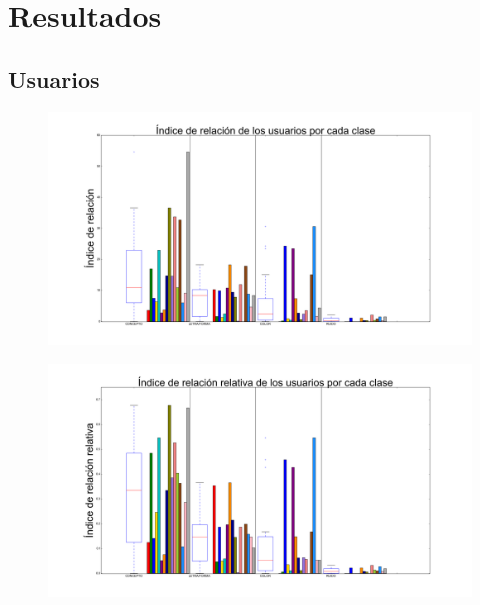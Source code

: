 \documentclass{beamer}
\begin{document}
\section{Resultados}

\subsection{Usuarios}


\begin{frame}

\begin{figure}[h]
 \centering
  \begin{minipage}[c]{1\textwidth}
	\centering	
	\includegraphics[scale=0.23]{ir_uxc.png}
  \end{minipage}
\end{figure}

\end{frame}
\begin{frame}

\begin{figure}[h]
 \centering
  \begin{minipage}[c]{1\textwidth}
	\centering	
	\includegraphics[scale=0.23]{irr_uxc.png}
  \end{minipage}
\end{figure}

\end{frame}
\end{document}
